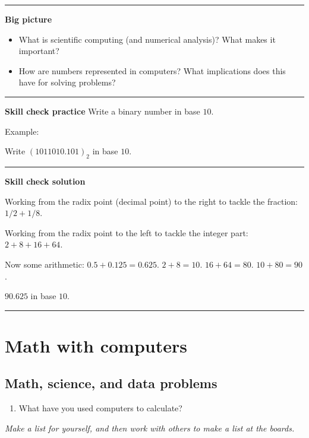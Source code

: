 \documentclass[12pt,letterpaper,noanswers]{exam}
\begin{document}
\hrule
\vspace{0.2cm}


\noindent\textbf{Big picture}
\begin{itemize}
    \itemsep0pt
\item What is scientific computing (and numerical analysis)?  What makes it important?

\item How are numbers represented in computers?  What implications does this have for solving problems?
\end{itemize}

\vspace{0.2cm}
\hrule
\vspace{0.2cm}

\noindent \textbf{Skill check practice}
Write a binary number in base $10$.  

\noindent Example:

Write $(1011010.101)_2$ in base $10$.


\vspace{0.2cm}
\hrule
\vspace{0.2cm}

\noindent \textbf{Skill check solution}

Working from the radix point (decimal point) to the right to tackle the fraction: $1/2 + 1/8$.

Working from the radix point to the left to tackle the integer part: $2 + 8 + 16 + 64$.

Now some arithmetic: $0.5 + 0.125 = 0.625$.  $2+8 = 10$.  $16 + 64 = 80$.  $10 + 80 = 90$.

$90.625$ in base $10$.

\vspace{0.2cm}
\hrule
\vspace{0.2cm}

\section{Math with computers}
\subsection{Math, science, and data problems}
\begin{enumerate}
\item What have you used computers to calculate?
\end{enumerate}
\noindent \emph{Make a list for yourself, and then work with others to make a list at the boards.}
\vspace{1in}
\end{document}
